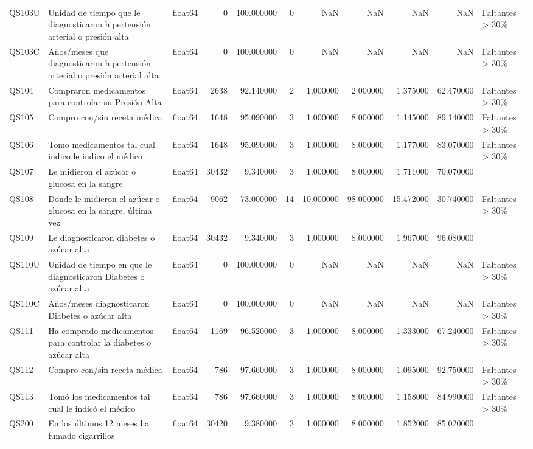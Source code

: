 \begin{longtable}{lllrrrrrrrl}
QS103U & Unidad de tiempo que le diagnosticaron hipertensión arterial o presión alta & float64 & 0 & 100.000000 & 0 & NaN & NaN & NaN & NaN & Faltantes > 30\% \\
QS103C & Años/meses que diagnosticaron hipertensión arterial o presión arterial alta & float64 & 0 & 100.000000 & 0 & NaN & NaN & NaN & NaN & Faltantes > 30\% \\
QS104 & Compraron medicamentos para controlar su Presión Alta & float64 & 2638 & 92.140000 & 2 & 1.000000 & 2.000000 & 1.375000 & 62.470000 & Faltantes > 30\% \\
QS105 & Compro con/sin receta médica & float64 & 1648 & 95.090000 & 3 & 1.000000 & 8.000000 & 1.145000 & 89.140000 & Faltantes > 30\% \\
QS106 & Tomo medicamentos tal cual indico le indico el médico & float64 & 1648 & 95.090000 & 3 & 1.000000 & 8.000000 & 1.177000 & 83.070000 & Faltantes > 30\% \\
QS107 & Le midieron el azúcar o glucosa en la sangre & float64 & 30432 & 9.340000 & 3 & 1.000000 & 8.000000 & 1.711000 & 70.070000 &  \\
QS108 & Donde le midieron el azúcar o glucosa en la sangre, última vez & float64 & 9062 & 73.000000 & 14 & 10.000000 & 98.000000 & 15.472000 & 30.740000 & Faltantes > 30\% \\
QS109 & Le diagnosticaron diabetes o azúcar alta & float64 & 30432 & 9.340000 & 3 & 1.000000 & 8.000000 & 1.967000 & 96.080000 &  \\
QS110U & Unidad de tiempo en que le diagnosticaron Diabetes o azúcar alta & float64 & 0 & 100.000000 & 0 & NaN & NaN & NaN & NaN & Faltantes > 30\% \\
QS110C & Años/meses diagnosticaron Diabetes o azúcar alta & float64 & 0 & 100.000000 & 0 & NaN & NaN & NaN & NaN & Faltantes > 30\% \\
QS111 & Ha comprado medicamentos para controlar la diabetes o azúcar alta & float64 & 1169 & 96.520000 & 3 & 1.000000 & 8.000000 & 1.333000 & 67.240000 & Faltantes > 30\% \\
QS112 & Compro con/sin receta médica & float64 & 786 & 97.660000 & 3 & 1.000000 & 8.000000 & 1.095000 & 92.750000 & Faltantes > 30\% \\
QS113 & Tomó los medicamentos tal cual le indicó el médico & float64 & 786 & 97.660000 & 3 & 1.000000 & 8.000000 & 1.158000 & 84.990000 & Faltantes > 30\% \\
QS200 & En los  últimos 12 meses ha fumado cigarrillos & float64 & 30420 & 9.380000 & 3 & 1.000000 & 8.000000 & 1.852000 & 85.020000 &  \\

\end{longtable}
